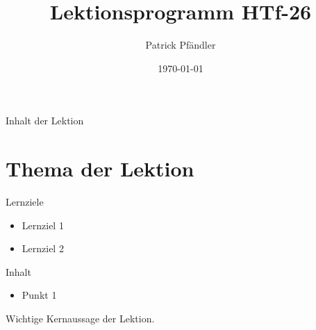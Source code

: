 %
%
\def\customoptions{aspectratio=169} %



\title{\textbf{Lektionsprogramm HTf-26}}
\author{Patrick Pfändler}
\date{\today}



\frame{\titlepage}

\begin{frame}{Inhalt der Lektion}
    \tableofcontents
\end{frame}

\folieFragen


\section{Thema der Lektion}
\BlueSectionSlide

\begin{frame}{Lernziele}
    \begin{myLernziele}
        \begin{itemize}
            \item[\textbullet] Lernziel 1
            \item[\textbullet] Lernziel 2
        \end{itemize}
    \end{myLernziele}
\end{frame}

\begin{frame}{Inhalt}
    \begin{itemize}
        \item[\textbullet] Punkt 1
    \end{itemize}

    \begin{Merke}
        Wichtige Kernaussage der Lektion.
    \end{Merke}
\end{frame}



